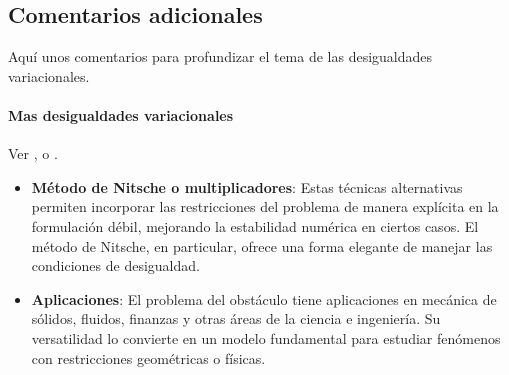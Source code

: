 \documentclass[12pt]{book}
\theoremstyle{definition}
\theoremstyle{plain}
\theoremstyle{remark}
\begin{document}
\subsection{Comentarios adicionales}

Aquí unos comentarios para profundizar el tema de las desigualdades variacionales.

\paragraph{Mas desigualdades variacionales}

Ver \cite{duvaut72}, \cite{glowinski80,glowinski81} o \cite{tarzia1981}.




\begin{itemize}
    \item 
    
    
    \textbf{Método de Nitsche o multiplicadores}: Estas técnicas alternativas permiten incorporar las restricciones del problema de manera explícita en la formulación débil, mejorando la estabilidad numérica en ciertos casos. El método de Nitsche, en particular, ofrece una forma elegante de manejar las condiciones de desigualdad.
    \item \textbf{Aplicaciones}: El problema del obstáculo tiene aplicaciones en mecánica de sólidos, fluidos, finanzas y otras áreas de la ciencia e ingeniería. Su versatilidad lo convierte en un modelo fundamental para estudiar fenómenos con restricciones geométricas o físicas.
\end{itemize}

%
%



\end{document}

